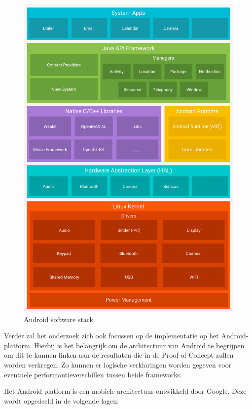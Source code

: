 \begin{figure}
  \centering
  \includegraphics[width=0.9\linewidth]{img/android}
  \caption{Android software stack}
  \label{fig:Android software stack(BRON)}
\end{figure}

Verder zal het onderzoek zich ook focussen op de implementatie op het Android-platform. Hierbij is het belangrijk om de architectuur van Android te begrijpen om dit te kunnen linken aan de resultaten die in de Proof-of-Concept zullen worden verkregen. Zo kunnen er logische verklaringen worden gegeven voor eventuele performantieverschillen tussen beide frameworks.

Het Android platform is een mobiele architectuur ontwikkeld door Google. Deze wordt opgedeeld in de volgende lagen:

